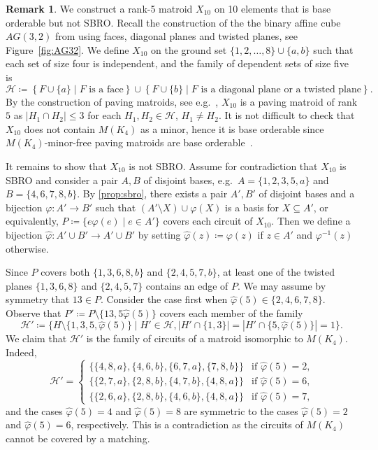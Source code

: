 \documentclass[11pt,a4paper]{article}
\theoremstyle{plain}
\theoremstyle{definition}
\newtheorem{rem}[thm]{Remark}
\newcommand{\cH}{\mathcal{H}}
\newcommand{\phiext}{\hat{\varphi}}
\begin{document}
\begin{rem} \label{rem:xten}
We construct a rank-5 matroid $X_{10}$ on 10 elements %
that is base orderable but not SBRO. Recall the construction of the the binary affine cube $AG(3,2)$ from \cite[page 645]{oxley2011matroid} using faces, diagonal planes and twisted planes, see Figure~\ref{fig:AG32}. We define $X_{10}$ on the ground set $\{1,2,\dots, 8\} \cup \{a,b\}$ such that each set of size four is independent, and the family of dependent sets of size five is 
\begin{equation*}
\mathcal{H} \coloneqq \left\{F\cup \{a\}\mid  \text{$F$ is a face}\right\} \cup \left\{F\cup \{b\}\mid \text{$F$ is a diagonal plane or a twisted plane}\right\}.
\end{equation*}
By the construction of paving matroids, see e.g.~\cite[Theorem~5.3.5]{frank2011connections}, $X_{10}$ is a paving matroid of rank $5$ as $|H_1 \cap H_2| \le 3$ for each $H_1, H_2 \in \mathcal{H}$, $H_1 \ne H_2$. It is not difficult to check that $X_{10}$ does not contain $M(K_4)$ as a minor, hence it is base orderable since $M(K_4)$-minor-free paving matroids are base orderable~\cite{bonin2016infinite}. 

It remains to show that $X_{10}$ is not SBRO. Assume for contradiction that $X_{10}$ is SBRO and consider a pair $A, B$ of disjoint bases, e.g.\ $A = \{1,2,3,5, a\}$ and $B = \{4,6,7,8,b\}$. By \ref{prop:sbro}, there exists a pair $A', B'$ of disjoint bases and a bijection $\varphi\colon A' \to B'$ such that $(A' \setminus X) \cup \varphi(X)$ is a basis for $X \subseteq A'$, or equivalently, $P \coloneqq \{e\varphi(e) \mid e \in A'\}$ covers each circuit of $X_{10}$. Then we define a bijection $\phiext\colon A'\cup B'\to A'\cup B'$ by setting $\phiext(z)\coloneqq \varphi(z)$ if $z\in A'$ and $\varphi^{-1}(z)$ otherwise.

Since $P$ covers both $\{1,3,6,8,b\}$ and $\{2,4,5,7,b\}$, at least one of the twisted planes $\{1,3,6,8\}$ and $\{2,4,5,7\}$ contains an edge of $P$. We may assume by symmetry that $13 \in P$. Consider the case first when $\phiext(5) \in \{2,4,6,7,8\}$.  Observe that $P' \coloneqq P \setminus \{13,5\phiext(5)\}$ covers each member of the family \[\cH' \coloneqq \{H\setminus \{1,3,5,\phiext(5)\} \mid H' \in \cH, |H' \cap \{1,3\}| = |H'\cap \{5, \phiext(5)\}| = 1\}.\]
We claim that $\cH'$ is the family of circuits of a matroid isomorphic to $M(K_4)$. Indeed,
\[\cH' = \begin{cases} \{\{4,8,a\}, \{4,6,b\}, \{6,7,a\}, \{7,8,b\}\} & \text{if $\phiext(5)=2$,} \\ \{\{2,7,a\},\{2,8,b\}, \{4,7,b\}, \{4,8,a\}\} & \text{if $\phiext(5) = 6$,} \\ \{\{2,6,a\}, \{2,8,b\}, \{4,6,b\}, \{4,8,a\}\} & \text{if $\phiext(5) = 7$,}\end{cases}\]
and the cases $\phiext(5) = 4$ and $\phiext(5) = 8$ are symmetric to the cases $\phiext(5) = 2$ and $\phiext(5) = 6$, respectively. This is a contradiction as the circuits of $M(K_4)$ cannot be covered by a matching.


\end{rem}
\end{document}
